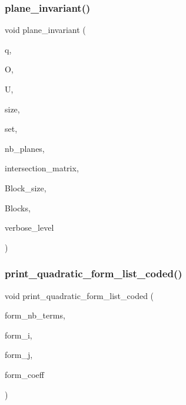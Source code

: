 \subsubsection{\texorpdfstring{plane\+\_\+invariant()}{plane\_invariant()}}
{\footnotesize\ttfamily void plane\+\_\+invariant (\begin{DoxyParamCaption}\item[{\mbox{\hyperlink{galois_8h_a09fddde158a3a20bd2dcadb609de11dc}{I\+NT}}}]{q,  }\item[{\mbox{\hyperlink{classorthogonal}{orthogonal}} $\ast$}]{O,  }\item[{\mbox{\hyperlink{classunusual__model}{unusual\+\_\+model}} $\ast$}]{U,  }\item[{\mbox{\hyperlink{galois_8h_a09fddde158a3a20bd2dcadb609de11dc}{I\+NT}}}]{size,  }\item[{\mbox{\hyperlink{galois_8h_a09fddde158a3a20bd2dcadb609de11dc}{I\+NT}} $\ast$}]{set,  }\item[{\mbox{\hyperlink{galois_8h_a09fddde158a3a20bd2dcadb609de11dc}{I\+NT}} \&}]{nb\+\_\+planes,  }\item[{\mbox{\hyperlink{galois_8h_a09fddde158a3a20bd2dcadb609de11dc}{I\+NT}} $\ast$\&}]{intersection\+\_\+matrix,  }\item[{\mbox{\hyperlink{galois_8h_a09fddde158a3a20bd2dcadb609de11dc}{I\+NT}} \&}]{Block\+\_\+size,  }\item[{\mbox{\hyperlink{galois_8h_a09fddde158a3a20bd2dcadb609de11dc}{I\+NT}} $\ast$\&}]{Blocks,  }\item[{\mbox{\hyperlink{galois_8h_a09fddde158a3a20bd2dcadb609de11dc}{I\+NT}}}]{verbose\+\_\+level }\end{DoxyParamCaption})}

\mbox{\label{data_8_c_a2bb4d3be5cd3ccde84a8063391e51578}} 
\subsubsection{\texorpdfstring{print\+\_\+quadratic\+\_\+form\+\_\+list\+\_\+coded()}{print\_quadratic\_form\_list\_coded()}}
{\footnotesize\ttfamily void print\+\_\+quadratic\+\_\+form\+\_\+list\+\_\+coded (\begin{DoxyParamCaption}\item[{\mbox{\hyperlink{galois_8h_a09fddde158a3a20bd2dcadb609de11dc}{I\+NT}}}]{form\+\_\+nb\+\_\+terms,  }\item[{\mbox{\hyperlink{galois_8h_a09fddde158a3a20bd2dcadb609de11dc}{I\+NT}} $\ast$}]{form\+\_\+i,  }\item[{\mbox{\hyperlink{galois_8h_a09fddde158a3a20bd2dcadb609de11dc}{I\+NT}} $\ast$}]{form\+\_\+j,  }\item[{\mbox{\hyperlink{galois_8h_a09fddde158a3a20bd2dcadb609de11dc}{I\+NT}} $\ast$}]{form\+\_\+coeff }\end{DoxyParamCaption})}

